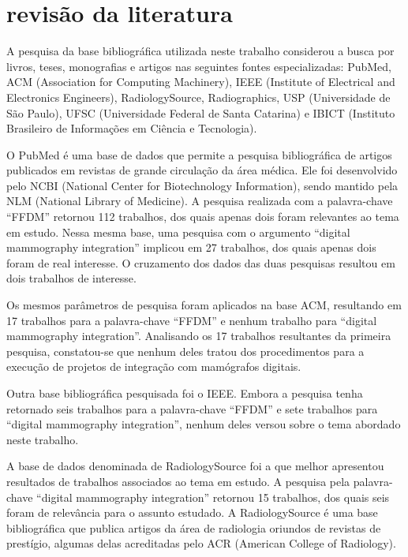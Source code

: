 \section[REVISÃO DA LITERATURA]{revisão da literatura}

A pesquisa da base bibliográfica utilizada neste trabalho considerou a busca por livros,
teses, monografias e artigos nas seguintes fontes especializadas: PubMed, ACM
(Association for Computing Machinery), IEEE (Institute of Electrical and Electronics
Engineers), RadiologySource, Radiographics, USP (Universidade de São Paulo), UFSC
(Universidade Federal de Santa Catarina) e IBICT (Instituto Brasileiro de Informações em
Ciência e Tecnologia).

O PubMed é uma base de dados que permite a pesquisa bibliográfica de artigos
publicados em revistas de grande circulação da área médica. Ele foi desenvolvido pelo
NCBI (National Center for Biotechnology Information), sendo mantido pela NLM
(National Library of Medicine). A pesquisa realizada com a palavra-chave “FFDM”
retornou 112 trabalhos, dos quais apenas dois foram relevantes ao tema em estudo. Nessa
mesma base, uma pesquisa com o argumento “digital mammography integration” implicou
em 27 trabalhos, dos quais apenas dois foram de real interesse. O cruzamento dos dados
das duas pesquisas resultou em dois trabalhos de interesse.

Os mesmos parâmetros de pesquisa foram aplicados na base ACM, resultando em 17
trabalhos para a palavra-chave “FFDM” e nenhum trabalho para “digital mammography
integration”. Analisando os 17 trabalhos resultantes da primeira pesquisa, constatou-se que
nenhum deles tratou dos procedimentos para a execução de projetos de integração com
mamógrafos digitais.

Outra base bibliográfica pesquisada foi o IEEE. Embora a pesquisa tenha retornado
seis trabalhos para a palavra-chave “FFDM” e sete trabalhos para “digital mammography
integration”, nenhum deles versou sobre o tema abordado neste trabalho.

A base de dados denominada de RadiologySource foi a que melhor apresentou
resultados de trabalhos associados ao tema em estudo. A pesquisa pela palavra-chave
“digital mammography integration” retornou 15 trabalhos, dos quais seis foram de
relevância para o assunto estudado. A RadiologySource é uma base bibliográfica que
publica artigos da área de radiologia oriundos de revistas de prestígio, algumas delas
acreditadas pelo ACR (American College of Radiology).

